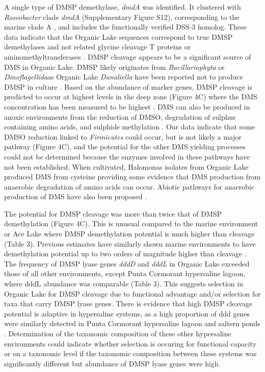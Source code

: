 A single type of \ac{DMSP} demethylase, \emph{dmdA} was identified. 
It clustered with \emph{Roseobacter} clade \emph{dmdA} (Supplementary Figure S12), corresponding to the marine clade A \cite{Howard2006}, and includes the functionally verified \cite{R. pomeroyi} DSS-3 homolog. 
These data indicate that the Organic Lake sequences correspond to true \ac{DMSP} demethylases and not related glycine cleavage T proteins or aminomethyltransferases \cite{Howard2006}. 
\ac{DMSP} cleavage appears to be a significant source of \ac{DMS} in Organic Lake. 
\ac{DMSP} likely originates from \emph{Bacillariophyta} or \emph{Dinoflagellida}as Organic Lake \emph{Dunaliella} have been reported not to produce \ac{DMSP} in culture \cite{Franzmann1987b}. 
Based on the abundance of marker genes, \ac{DMSP} cleavage is predicted to occur at highest levels in the deep zone (Figure 4C) where the \ac{DMS} concentration has been measured to be highest \cite{Deprez1986, Franzmann1987b, Gibson1991, Roberts1993a, Roberts1993b}. 
\ac{DMS} can also be produced in anoxic environments from the reduction of \ac{DMSO}, degradation of sulphur containing amino acids, and sulphide methylation \cite{Schafer2010}. 
Our data indicate that some \ac{DMSO} reduction linked to \emph{Firmicutes} could occur, but is not likely a major pathway (Figure 4C), and the potential for the other \ac{DMS} yielding processes could not be determined because the enzymes involved in these pathways have not been established. 
When cultivated, Halomonas isolates from Organic Lake produced \ac{DMS} from cysteine \cite{Franzmann1987b} providing some evidence that \ac{DMS} production from anaerobic degradation of amino acids can occur. 
Abiotic pathways for anaerobic production of \ac{DMS} have also been proposed \cite{Roberts1993b}.

The potential for \ac{DMSP} cleavage was more than twice that of \ac{DMSP} demethylation (Figure 4C). 
This is unusual compared to the marine environment or Ace Lake where \ac{DMSP} demethylation potential is much higher than cleavage (Table 3). 
Previous estimates have similarly shown marine environments to have demethylation potential up to two orders of magnitude higher than cleavage \cite{Howard2008, Todd2009, Todd2011, Reisch2011b}. 
The frequency of \ac{DMSP} lyase genes \emph{dddD} and \emph{dddL} in Organic Lake exceeded those of all other environments, except Punta Cormorant hypersaline lagoon, where dddL abundance was comparable (Table 3). 
This suggests selection in Organic Lake for \ac{DMSP} cleavage due to functional advantage and/or selection for taxa that carry \ac{DMSP} lyase genes. 
There is evidence that high \ac{DMSP} cleavage potential is adaptive in hypersaline systems, as a high proportion of ddd genes were similarly detected in Punta Cormorant hypersaline lagoon and saltern ponds \cite{Raina2010}. Determination of the taxonomic composition of these other hypersaline environments could indicate whether selection is occuring for functional capacity or on a taxonomic level if the taxonomic composition between these systems was significantly different but abundance of DMSP lyase genes were high.

